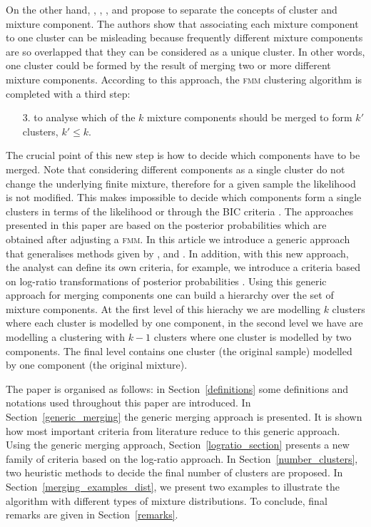 \documentclass[submit]{smj}
\theoremstyle{definition}
\newcommand{\fmm}{\textsc{fmm}\xspace}
\begin{document}
On the other hand, \cite{lee2004combining}, \cite{hennig2010methods}, \cite{baudry2010combining}, \cite{melnykov2013distribution} and \cite{pastore2013merging} propose to separate the concepts of cluster and mixture component. The authors show that associating each mixture component to one cluster can be misleading because frequently different mixture components are so overlapped that they can be considered as a unique cluster. In other words, one cluster could be formed by the result of merging two or more different mixture components. According to this approach, the \fmm clustering algorithm is completed with a third step:

\begin{itemize}
\item[3.] to analyse which of the $k$ mixture components should be merged to form $k'$ clusters, $k' \leq k$.
\end{itemize}

The crucial point of this new step is how to decide which components have to be merged. Note that considering different components as a single cluster do not change the underlying finite mixture, therefore for a given sample the likelihood is not modified. This makes impossible to decide which components form a single clusters in terms of the likelihood or through the BIC criteria \citep{hennig2010methods}. The approaches presented in this paper are based on the posterior probabilities which are obtained after adjusting a \fmm. In this article we introduce a generic approach that generalises methods given by \cite{baudry2010combining}, \cite{hennig2010methods} and \cite{longford2014}. In addition, with this new approach, the analyst can define its own criteria, for example, we introduce a criteria based on log-ratio transformations of posterior probabilities \citep{aitchison1986statistical}. Using this generic approach for merging components one can build a hierarchy over the set of mixture components. At the first level of this hierachy we are modelling $k$ clusters where each cluster is modelled by one component, in the second level we have are modelling a clustering with $k-1$ clusters where one cluster is modelled by two components. The final level contains one cluster (the original sample) modelled by one component (the original mixture).

The paper is organised as follows: in Section~\ref{definitions} some definitions and notations used throughout this paper are introduced. In Section~\ref{generic_merging} the generic merging approach is presented. It is shown how most important criteria from literature reduce to this generic approach. Using the generic merging approach, Section~\ref{logratio_section} presents a new family of criteria based on the log-ratio approach. In Section~\ref{number_clusters}, two heuristic methods to decide the final number of clusters are proposed. In Section~\ref{merging_examples_dist}, we present two examples to illustrate the algorithm with different types of mixture distributions. To conclude, final remarks are given in Section~\ref{remarks}.
\end{document}
